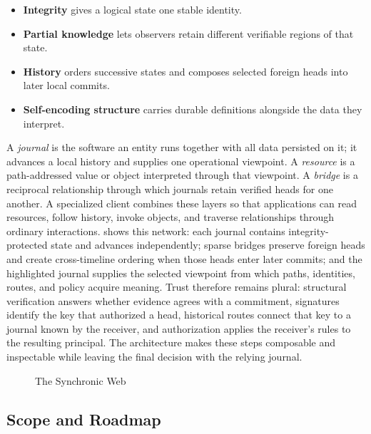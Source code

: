 \begin{itemize}
  \item \textbf{Integrity} gives a logical state one stable identity.
  \item \textbf{Partial knowledge} lets observers retain different verifiable regions of that state.
  \item \textbf{History} orders successive states and composes selected foreign heads into later local commits.
  \item \textbf{Self-encoding structure} carries durable definitions alongside the data they interpret.
\end{itemize}

A \emph{journal} is the software an entity runs together with all data persisted on it; it advances a local history and supplies one operational viewpoint. A \emph{resource} is a path-addressed value or object interpreted through that viewpoint. A \emph{bridge} is a reciprocal relationship through which journals retain verified heads for one another. A specialized client combines these layers so that applications can read resources, follow history, invoke objects, and traverse relationships through ordinary interactions.  shows this network: each journal contains integrity-protected state and advances independently; sparse bridges preserve foreign heads and create cross-timeline ordering when those heads enter later commits; and the highlighted journal supplies the selected viewpoint from which paths, identities, routes, and policy acquire meaning. Trust therefore remains plural: structural verification answers whether evidence agrees with a commitment, signatures identify the key that authorized a head, historical routes connect that key to a journal known by the receiver, and authorization applies the receiver's rules to the resulting principal. The architecture makes these steps composable and inspectable while leaving the final decision with the relying journal.

\begin{figure}[htbp]
  \centering
  \resizebox{\textwidth}{!}{}
  \caption{The Synchronic Web}
  \label{fig:journal-relative-web}
\end{figure}

\subsection{Scope and Roadmap}

